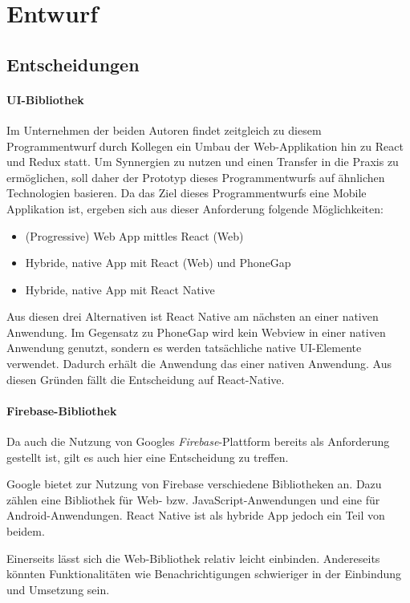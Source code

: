 \section{Entwurf}\label{sec:entwurf}

\subsection{Entscheidungen}
\paragraph{UI-Bibliothek}
Im Unternehmen der beiden Autoren findet zeitgleich zu diesem Programmentwurf durch Kollegen ein Umbau der Web-Applikation hin zu React und Redux statt.
Um Synnergien zu nutzen und einen Transfer in die Praxis zu ermöglichen, soll daher der Prototyp dieses Programmentwurfs auf ähnlichen Technologien basieren.
Da das Ziel dieses Programmentwurfs eine Mobile Applikation ist, ergeben sich aus dieser Anforderung folgende Möglichkeiten:
\begin{itemize}
    \item (Progressive) Web App mittles React (Web)
    \item Hybride, native App mit React (Web) und PhoneGap
    \item Hybride, native App mit React Native
\end{itemize}

Aus diesen drei Alternativen ist React Native am nächsten an einer nativen Anwendung.
Im Gegensatz zu PhoneGap wird kein Webview in einer nativen Anwendung genutzt,
sondern es werden tatsächliche native UI-Elemente verwendet.
Dadurch erhält die Anwendung das  einer nativen Anwendung. Aus diesen Gründen fällt die Entscheidung auf React-Native.

\paragraph{Firebase-Bibliothek}
Da auch die Nutzung von Googles \textit{Firebase}-Plattform bereits als Anforderung gestellt ist,
gilt es auch hier eine Entscheidung zu treffen.

Google bietet zur Nutzung von Firebase verschiedene Bibliotheken an.
Dazu zählen eine Bibliothek für Web- bzw. JavaScript-Anwendungen und eine für Android-Anwendungen.
React Native ist als hybride App jedoch ein Teil von beidem.

Einerseits lässt sich die Web-Bibliothek relativ leicht einbinden.
Andereseits könnten Funktionalitäten wie Benachrichtigungen schwieriger in der Einbindung und Umsetzung sein.

